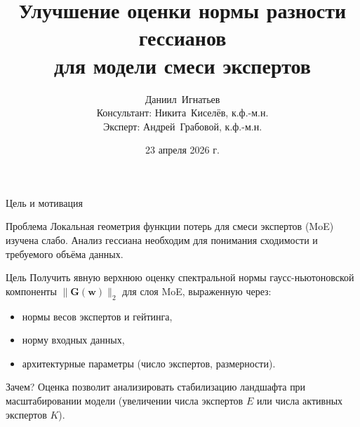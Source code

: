 \documentclass[aspectratio=169]{beamer}
\title{Улучшение оценки нормы разности гессианов\\ для модели смеси экспертов}
\author{
    Даниил~Игнатьев\\
    Консультант: Никита~Киселёв, к.ф.-м.н.\\
    Эксперт: Андрей~Грабовой, к.ф.-м.н.
}
\institute{
    Курс: Моя первая научная статья\\
    МФТИ, кафедра интеллектуальных систем
}
\date{23 апреля 2026 г.}
\begin{document}
\begin{frame}
    \thispagestyle{empty}
    \maketitle
\end{frame}

\begin{frame}{Цель и мотивация}
    \begin{block}{Проблема}
        Локальная геометрия функции потерь для смеси экспертов (MoE) изучена слабо.
        Анализ гессиана необходим для понимания сходимости и требуемого объёма данных.
    \end{block}
    \begin{block}{Цель}
        Получить явную верхнюю оценку спектральной нормы гаусс-ньютоновской компоненты
        $\|\mathbf{G}(\mathbf{w})\|_2$ для слоя MoE, выраженную через:
        \begin{itemize}
            \item нормы весов экспертов и гейтинга,
            \item норму входных данных,
            \item архитектурные параметры (число экспертов, размерности).
        \end{itemize}
    \end{block}
    \begin{block}{Зачем?}
        Оценка позволит анализировать стабилизацию ландшафта при масштабировании модели
        (увеличении числа экспертов $E$ или числа активных экспертов $K$).
    \end{block}
\end{frame}
\end{document}
